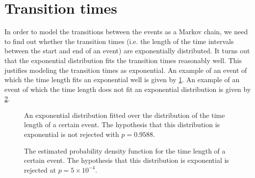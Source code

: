 \section{Transition times}
In order to model the transitions between the events as a Markov chain, we need to find out whether the transition times (i.e. the length of the time intervals between the start and end of an event) are exponentially distributed.
It turns out that the exponential distribution fits the transition times reasonably well.
This justifies modeling the transition times as exponential.
An example of an event of which the time length fits an exponential well is given by \ref{figure:transitionFitGood}.
An example of an event of which the time length does not fit an exponential distribution is given by \ref{figure:transitionFitBad}.

\begin{figure}[H]\label{figure:transitionFitGood}
\centering
\setlength{}

\caption{An exponential distribution fitted over the distribution of the time length of a certain event. The hypothesis that this distribution is exponential is not rejected with $p=0.9588$.}
\end{figure}
\begin{figure}[H]\label{figure:transitionFitBad}
\centering
\setlength{}

\caption{The estimated probability density function for the time length of a certain event. The hypothesis that this distribution is exponential is rejected at $p=5\times10^{-4}$.}
\end{figure}